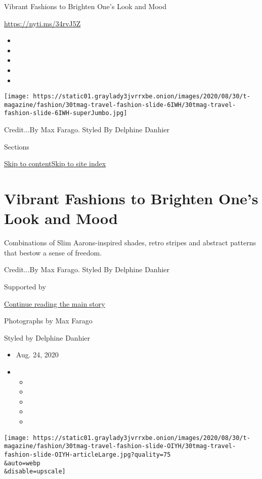 Vibrant Fashions to Brighten One's Look and Mood

\url{https://nyti.ms/34rvJ5Z}

\begin{itemize}
\item
\item
\item
\item
\item
\end{itemize}

\texttt{[image: https://static01.graylady3jvrrxbe.onion/images/2020/08/30/t-magazine/fashion/30tmag-travel-fashion-slide-6IWH/30tmag-travel-fashion-slide-6IWH-superJumbo.jpg]}

Credit...By Max Farago. Styled By Delphine Danhier

Sections

\protect\hyperlink{site-content}{Skip to
content}\protect\hyperlink{site-index}{Skip to site index}

\hypertarget{vibrant-fashions-to-brighten-ones-look-and-mood}{%
\section{Vibrant Fashions to Brighten One's Look and
Mood}\label{vibrant-fashions-to-brighten-ones-look-and-mood}}

Combinations of Slim Aarons-inspired shades, retro stripes and abstract
patterns that bestow a sense of freedom.

Credit...By Max Farago. Styled By Delphine Danhier

Supported by

\protect\hyperlink{after-sponsor}{Continue reading the main story}

Photographs by Max Farago

Styled by Delphine Danhier

\begin{itemize}
\item
  Aug. 24, 2020
\item
  \begin{itemize}
  \item
  \item
  \item
  \item
  \item
  \end{itemize}
\end{itemize}

\texttt{[image: https://static01.graylady3jvrrxbe.onion/images/2020/08/30/t-magazine/fashion/30tmag-travel-fashion-slide-OIYH/30tmag-travel-fashion-slide-OIYH-articleLarge.jpg?quality=75\\\&auto=webp\\\&disable=upscale]}

